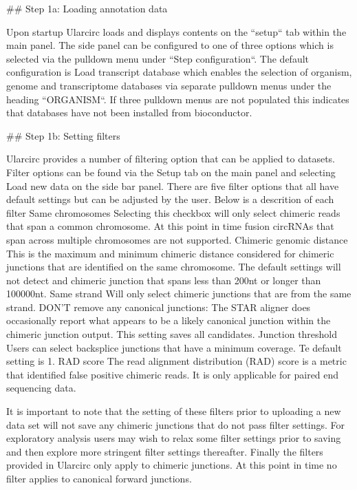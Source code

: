 ## Step 1a: Loading annotation data

Upon startup Ularcirc loads and displays contents on the ``setup`` tab within the main panel. The side panel can be configured to one of three options which is selected via the pulldown menu under ``Step configuration``. The default configuration  is Load transcript database which enables the selection of organism, genome and transcriptome databases via separate pulldown menus under the heading ``ORGANISM``. If three pulldown menus are not populated this indicates that databases have not been installed from bioconductor.

## Step 1b: Setting filters

Ularcirc provides a number of filtering option that can be applied to datasets. Filter options can be found via the Setup tab on the main panel and selecting Load new data on the side bar panel. There are five filter options that all have default settings but can be adjusted by the user. Below is a descrition of each filter
 Same chromosomes  Selecting this checkbox will only select chimeric reads that span a common chromosome. At this point in time fusion circRNAs that span across multiple chromosomes are not supported. 
Chimeric genomic distance   This is the maximum and minimum chimeric distance considered for chimeric junctions that are identified on the same chromosome. The default settings will not detect and chimeric junction that spans less than 200nt or longer than 100000nt. 
 Same strand Will only select chimeric junctions that are from the same strand.
 DON'T remove any canonical junctions: The STAR aligner does occasionally report what appears to be a likely canonical junction within the chimeric junction output. This setting saves all candidates. 
 Junction threshold Users can select backsplice junctions that have a minimum coverage. Te default setting is 1.
 RAD score The read alignment distribution (RAD) score is a metric that identified false positive chimeric reads. It is only applicable for paired end sequencing data. 

It is important to note that the setting of these filters prior to uploading a new data set will not save  any chimeric junctions that do not pass filter settings. For exploratory analysis users may wish to relax some filter settings prior to saving and then explore more stringent filter settings thereafter. Finally the filters provided in Ularcirc only apply to chimeric junctions. At this point in time no filter applies to canonical forward junctions. 

